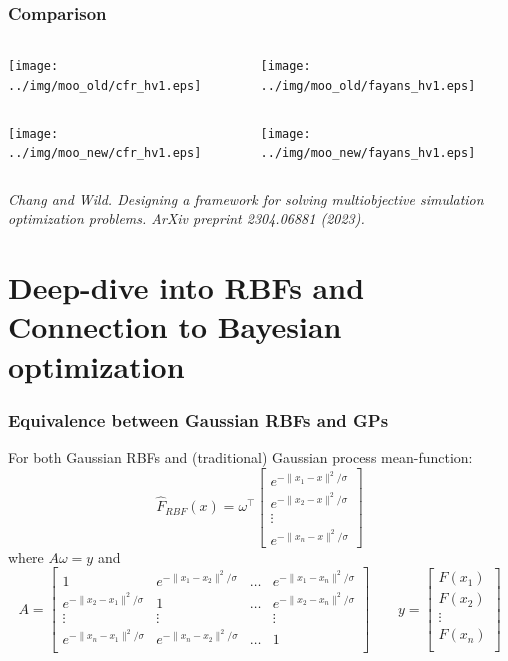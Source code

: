 \documentclass[aspectratio=169]{beamer}
\begin{document}
\begin{frame}\frametitle{Comparison}
\begin{columns}
\begin{column}{0.5\textwidth}
\texttt{[image: ../img/moo\_old/cfr\_hv1.eps]}
\end{column}
\begin{column}{0.5\textwidth}
\texttt{[image: ../img/moo\_old/fayans\_hv1.eps]}
\end{column}
\end{columns}
\begin{columns}
\begin{column}{0.5\textwidth}
\texttt{[image: ../img/moo\_new/cfr\_hv1.eps]}
\end{column}
\begin{column}{0.5\textwidth}
\texttt{[image: ../img/moo\_new/fayans\_hv1.eps]}
\end{column}
\end{columns}

\vfill

{\tiny\it
Chang and Wild.
Designing a framework for solving multiobjective simulation optimization problems.
ArXiv preprint 2304.06881 (2023).
}
\end{frame}

\section{Deep-dive into RBFs and Connection to Bayesian optimization}

\begin{frame}\frametitle{Equivalence between Gaussian RBFs and GPs}
For both Gaussian RBFs and (traditional) Gaussian process mean-function:
$$
{\hat F}_{RBF}(x) =
\omega^\top \left[ \begin{array}{c}
e^{-\|x_1 - x\|^2/\sigma}\\
e^{-\|x_2 - x\|^2/\sigma}\\
\vdots\\
e^{-\|x_n - x\|^2/\sigma}
\end{array} \right]
$$
\pause
where
$ A \omega = y $
and 
$$
A = 
\left[
\begin{array}{cccc}
1 & e^{-\|x_1 - x_2\|^2/\sigma} & \ldots & e^{-\|x_1 - x_n\|^2/\sigma} \\
e^{-\|x_2 - x_1\|^2/\sigma} & 1 & \ldots & e^{-\|x_2 - x_n\|^2/\sigma} \\
\vdots & \vdots &  & \vdots \\
e^{-\|x_n - x_1\|^2/\sigma} & e^{-\|x_n - x_2\|^2/\sigma} & \ldots & 1 \\
\end{array}
\right]
\qquad
y = 
\left[
\begin{array}{c}
F(x_1) \\
F(x_2) \\
\vdots \\
F(x_n) \\
\end{array}
\right]
$$

\end{frame}
\end{document}
